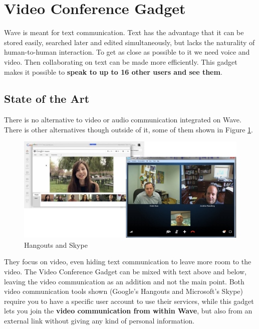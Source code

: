 \section{Video Conference Gadget}
Wave is meant for text communication. Text has the advantage that it can be stored easily, searched later and edited simultaneously, but lacks the naturality of human-to-human interaction. To get as close as possible to it we need voice and video. Then collaborating on text can be made more efficiently. This gadget makes it possible to \textbf{speak to up to 16 other users and see them}.

\label{subsec:video_soa}
\subsection{State of the Art}
There is no alternative to video or audio communication integrated on Wave. There is other alternatives though outside of it, some of them shown in Figure \ref{fig:skype_hangouts}.
\begin{figure}[H]
  \center
    \includegraphics[keepaspectratio, scale=0.6]{Media/Captures/Soa/skype_hangouts.png}
  \caption{Hangouts and Skype}
  \label{fig:skype_hangouts}
\end{figure}
They focus on video, even hiding text communication to leave more room to the video. The Video Conference Gadget can be mixed with text above and below, leaving the video communication as an addition and not the main point. Both video communication tools shown (Google's Hangouts and Microsoft's Skype) require you to have a specific user account to use their services, while this gadget lets you join the \textbf{video communication from within Wave}, but also from an external link without giving any kind of personal information.

